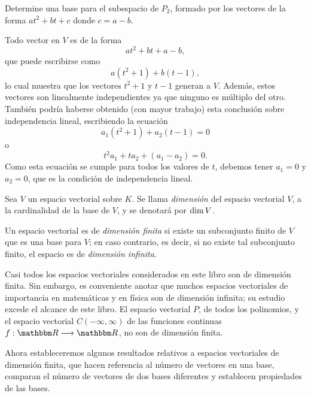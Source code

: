 \begin{examplebox}{}{}
    Determine una base para el subespacio de $P_2$, formado por los vectores de la forma $at^2 + bt + c$ donde $c = a - b$.

    \tcblower
    \solucion Todo vector en $V$ es de la forma
    $$at^2 + bt + a - b,$$
    que puede escribirse como
    $$a(t^2 + 1) + b(t - 1),$$
    \newpage
    lo cual muestra que los vectores $t^2 + 1$ y $t - 1$ generan a $V$. Además, estos vectores son linealmente independientes ya que ninguno es múltiplo del otro. También podría haberse obtenido (con mayor trabajo) esta conclusión sobre independencia lineal, escribiendo la ecuación
    $$a_1(t^2 + 1) + a_2(t - 1) = 0$$
    o
    $$t^2 a_1 + t a_2 + (a_1 - a_2) = 0.$$
    Como esta ecuación se cumple para todos los valores de $t$, debemos tener $a_1 = 0$ y $a_2 = 0$, que es la condición de independencia lineal.
\end{examplebox}

\begin{definicion}{}{}
    Sea $V$ un espacio vectorial sobre $K$. Se llama \emph{dimensión} del espacio vectorial $V$, a la cardinalidad de la base de $V$, y se denotará por $\operatorname{dim} V$.
\end{definicion}

Un espacio vectorial es de \emph{dimensión finita} si existe un subconjunto finito de $V$ que es una base para $V$; en caso contrario, es decir, si no existe tal subconjunto finito, el espacio es de \emph{dimensión infinita}.

Casi todos los espacios vectoriales considerados en este libro son de dimensión finita. Sin embargo, es conveniente anotar que muchos espacios vectoriales de importancia en matemáticas y en física son de dimensión infinita; su estudio excede el alcance de este libro. El espacio vectorial $P$, de todos los polinomios, y el espacio vectorial $C(-\infty, \infty)$ de las funciones continuas $f: \RR \longrightarrow \RR$, no son de dimensión finita.

Ahora estableceremos algunos resultados relativos a espacios vectoriales de dimensión finita, que hacen referencia al número de vectores en una base, comparan el número de vectores de dos bases diferentes y establecen propiedades de las bases.

